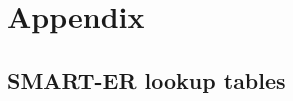 {}


\chapter*{Appendix}

\section*{SMART-ER lookup tables}
\label{appendix:smart-er-lookup-tables}

